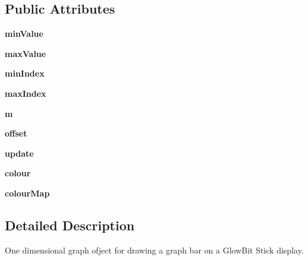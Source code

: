 \subsection*{Public Attributes}
\begin{DoxyCompactItemize}
\item 
\mbox{\label{classglowbit_1_1stick_1_1graph1D_a1a0b5e32db369f6b6253a2010abd9927}} 
{\bfseries min\+Value}
\item 
\mbox{\label{classglowbit_1_1stick_1_1graph1D_a3048e88f86ca331e54635ec2e6c60e5d}} 
{\bfseries max\+Value}
\item 
\mbox{\label{classglowbit_1_1stick_1_1graph1D_ad1e026360113687c6a2b6bec9f5b0cdc}} 
{\bfseries min\+Index}
\item 
\mbox{\label{classglowbit_1_1stick_1_1graph1D_a76946ca7d21c9323bc75a7cb254178ff}} 
{\bfseries max\+Index}
\item 
\mbox{\label{classglowbit_1_1stick_1_1graph1D_aa9e608ce7572fcd338d06431296c65ca}} 
{\bfseries m}
\item 
\mbox{\label{classglowbit_1_1stick_1_1graph1D_a5881c702849e31be5db908e316a18310}} 
{\bfseries offset}
\item 
\mbox{\label{classglowbit_1_1stick_1_1graph1D_aafaf7afb2c66c6b9c4edec4fc34c3722}} 
{\bfseries update}
\item 
\mbox{\label{classglowbit_1_1stick_1_1graph1D_aaad26d7930ec770e094d525c2cab12b8}} 
{\bfseries colour}
\item 
\mbox{\label{classglowbit_1_1stick_1_1graph1D_a52b7b7cc9d5385620272068f2255ddbd}} 
{\bfseries colour\+Map}
\end{DoxyCompactItemize}


\subsection{Detailed Description}
One dimensional graph ofject for drawing a graph bar on a Glow\+Bit Stick display. 

